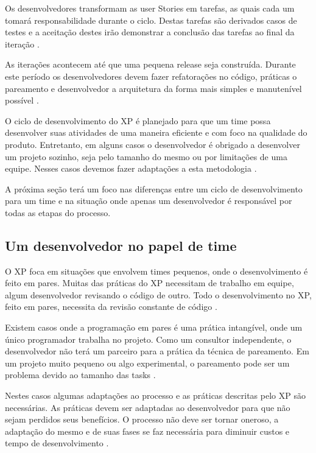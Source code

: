 Os desenvolvedores transformam as user Stories em tarefas, as quais cada um tomará responsabilidade durante o ciclo. Destas tarefas são derivados casos de testes e a aceitação  destes irão demonstrar a conclusão das tarefas ao final da iteração \cite{Beck:1999}.

As iterações acontecem até que uma pequena release seja construída. Durante este período os desenvolvedores devem fazer refatorações no código, práticas o pareamento e desenvolvedor a arquitetura da forma mais simples e manutenível possível \cite{Beck:2004}.

O ciclo de desenvolvimento do XP é planejado para que um time possa desenvolver suas atividades de uma maneira eficiente e com foco na qualidade do produto. Entretanto, em alguns casos o desenvolvedor é obrigado a desenvolver um projeto sozinho, seja pelo tamanho do mesmo ou por limitações de uma equipe. Nesses casos devemos fazer adaptações a esta metodologia .

A próxima seção terá um foco nas diferenças entre um ciclo de desenvolvimento para um time e na situação onde apenas um desenvolvedor é responsável por todas as etapas do processo.

\subsection{Um desenvolvedor no papel de time}

O XP foca em situações que envolvem times pequenos, onde o desenvolvimento é feito em pares. Muitas das práticas do XP necessitam de trabalho em equipe, algum desenvolvedor revisando o código de outro. Todo o desenvolvimento no XP, feito em pares, necessita da revisão constante de código \cite{Ron:2000}.

Existem casos onde a programação em pares é uma prática intangível, onde um único programador trabalha no projeto. Como um consultor independente, o desenvolvedor não terá um parceiro para a prática da técnica de pareamento. Em um projeto muito pequeno ou algo experimental, o pareamento pode ser um problema devido ao tamanho das tasks \cite{Agarwal:2008}.

Nestes casos algumas adaptações ao processo e as práticas descritas pelo XP são necessárias. As práticas devem ser adaptadas ao desenvolvedor para que não sejam perdidos seus benefícios. O processo não deve ser tornar oneroso, a adaptação do mesmo e de suas fases se faz necessária para diminuir custos e tempo de desenvolvimento \cite{Bernabe:2015}.

